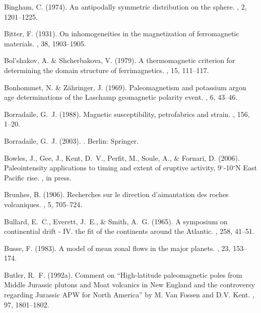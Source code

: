 Bingham, C. (1974).
\newblock An antipodally symmetric distribution on the sphere.
, 2, 1201--1225.

Bitter, F. (1931).
\newblock On inhomogeneities in the magnetization of ferromagnetic materials.
, 38, 1903--1905.

Bol'shakov, A. \& Shcherbakova, V. (1979).
\newblock A thermomagnetic criterion for determining the domain structure of
  ferrimagnetics.
, 15, 111--117.

Bonhommet, N. \& Z\"ahringer, J. (1969).
\newblock Paleomagnetism and potassium argon age determinations of the Laschamp
  geomagnetic polarity event.
, 6, 43--46.

Borradaile, G.~J. (1988).
\newblock Magnetic susceptibility, petrofabrics and strain.
, 156, 1--20.

Borradaile, G.~J. (2003).
.
\newblock Berlin: Springer.

Bowles, J., Gee, J., Kent, D.~V., Perfit, M., Soule, A., \& Fornari, D. (2006).
\newblock Paleointensity applications to timing and extent of eruptive
  activity, 9$^{\circ}$-10$^{\circ}$N East Pacific rise.
, in press.

Brunhes, B. (1906).
\newblock Recherches sur le direction d'aimantation des roches volcaniques.
, 5, 705--724.

Bullard, E.~C., Everett, J.~E., \& Smith, A.~G. (1965).
\newblock A symposium on continential drift - IV. the fit of the continents
  around the Atlantic.
, 258, 41--51.

Busse, F. (1983).
\newblock A model of mean zonal flows in the major planets.
, 23, 153--174.

Butler, R.~F. (1992a).
\newblock Comment on ``High-latitude paleomagnetic poles from Middle Jurassic
  plutons and Moat volcanics in New England and the controversy regarding
  Jurassic {APW} for North America'' by {M}. Van Fossen and {D}.{V}. Kent.
, 97, 1801--1802.

